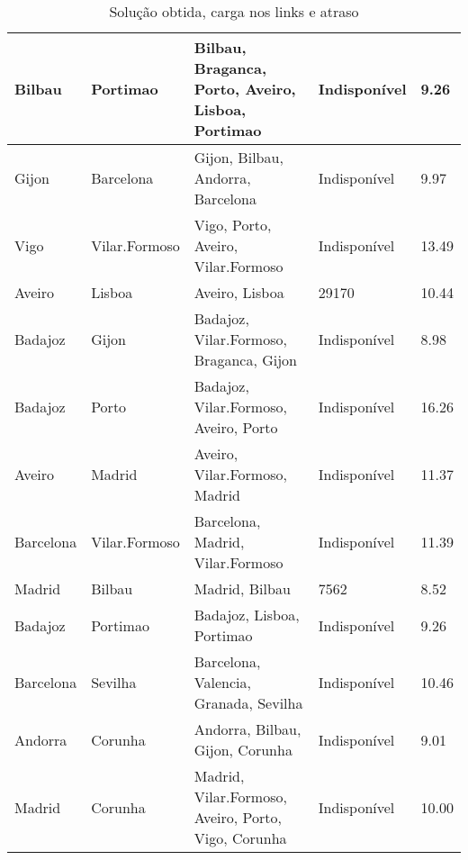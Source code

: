 \begin{table}[!htb]
{\begin{tabular}{|l|l|l|l|l|}
Bilbau & Portimao & Bilbau, Braganca, Porto, Aveiro, Lisboa, Portimao & Indisponível & 9.26 \\ \hline
Gijon & Barcelona & Gijon, Bilbau, Andorra, Barcelona & Indisponível & 9.97 \\ \hline
Vigo & Vilar.Formoso & Vigo, Porto, Aveiro, Vilar.Formoso & Indisponível & 13.49 \\ \hline
Aveiro & Lisboa & Aveiro, Lisboa & 29170 & 10.44 \\ \hline
Badajoz & Gijon & Badajoz, Vilar.Formoso, Braganca, Gijon & Indisponível & 8.98 \\ \hline
Badajoz & Porto & Badajoz, Vilar.Formoso, Aveiro, Porto & Indisponível & 16.26 \\ \hline
Aveiro & Madrid & Aveiro, Vilar.Formoso, Madrid & Indisponível & 11.37 \\ \hline
Barcelona & Vilar.Formoso & Barcelona, Madrid, Vilar.Formoso & Indisponível & 11.39 \\ \hline
Madrid & Bilbau & Madrid, Bilbau & 7562 & 8.52 \\ \hline
Badajoz & Portimao & Badajoz, Lisboa, Portimao & Indisponível & 9.26 \\ \hline
Barcelona & Sevilha & Barcelona, Valencia, Granada, Sevilha & Indisponível & 10.46 \\ \hline
Andorra & Corunha & Andorra, Bilbau, Gijon, Corunha & Indisponível & 9.01 \\ \hline
Madrid & Corunha & Madrid, Vilar.Formoso, Aveiro, Porto, Vigo, Corunha & Indisponível & 10.00 \\ \hline
\end{tabular}}
\caption[]{Solução obtida, carga nos links e atraso}
\end{table}

